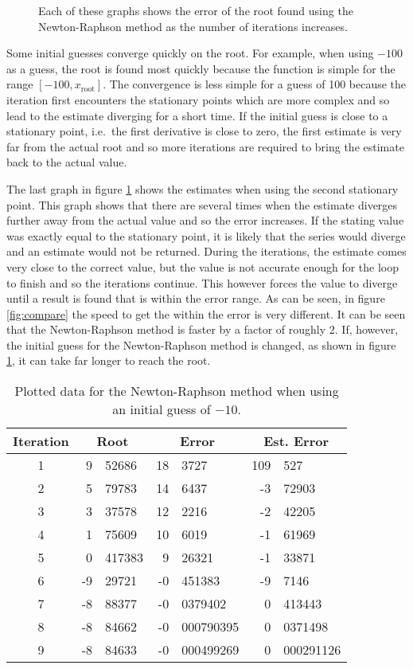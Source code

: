 \documentclass[11pt]{article} %
\newcommand{\inputTikZ}[1]{%
  }
\newcommand{\inputTikZ}[1]{%
    \beginpgfgraphicnamed{#1-external}%
    \endpgfgraphicnamed%
  }
\begin{document}
	\begin{figure}[ht]
		\centering
			\inputTikZ{Graph2}
		\caption{\label{fig:guesses}Each of these graphs shows the error of the root found using the Newton-Raphson method as the number of iterations increases.}
	\end{figure}
	 Some initial guesses converge quickly on the root. For example, when using $-100$ as a guess, the root is found most quickly because the function is simple for the range $[-100,x_{\text{root}}]$. The convergence is less simple for a guess of 100 because the iteration first encounters the stationary points which are more complex and so lead to the estimate diverging for a short time. If the initial guess is close to a stationary point, i.e.\ the first derivative is close to zero, the first estimate is very far from the actual root and so more iterations are required to bring the estimate back to the actual value. 

	 The last graph in figure \ref{fig:guesses} shows the estimates when using the second stationary point. This graph shows that there are several times when the estimate diverges further away from the actual value and so the error increases. If the stating value was exactly equal to the stationary point, it is likely that the series would diverge and an estimate would not be returned. During the iterations, the estimate comes very close to the correct value, but the value is not accurate enough for the loop to finish and so the iterations continue. This however forces the value to diverge until a result is found that is within the error range. As can be seen, in figure \ref{fig:compare} the speed to get the within the error is very different. It can be seen that the Newton-Raphson method is faster by a factor of roughly 2. If, however, the initial guess for the Newton-Raphson method is changed, as shown in figure \ref{fig:guesses}, it can take far longer to reach the root.
	\begin{table}[ht]
		\centering
		\begin{tabular}{c|r@{.}l|r@{.}l|r@{.}l}
			Iteration &\multicolumn{2}{c}{Root} &\multicolumn{2}{|c}{Error} &\multicolumn{2}{|c}{Est. Error} \\ \hline \hline
			1	&9&52686	&18&3727	&109&527 \\
			2	&5&79783	&14&6437	&-3&72903 \\
			3	&3&37578	&12&2216	&-2&42205 \\
			4	&1&75609	&10&6019	&-1&61969 \\
			5	&0&417383	&9&26321	&-1&33871 \\
			6	&-9&29721	&-0&451383	&-9&7146 \\
			7	&-8&88377	&-0&0379402	&0&413443 \\
			8	&-8&84662	&-0&000790395	&0&0371498 \\
			9	&-8&84633	&-0&000499269	&0&000291126 \\
		\end{tabular}
		\caption{Plotted data for the Newton-Raphson method when using an initial guess of $-10$.}
		\label{tab:myfirsttable}
	\end{table}
\end{document}
